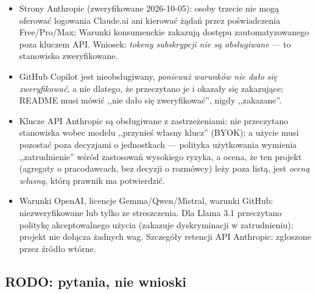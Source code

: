 \begin{itemize}[leftmargin=*]
    \item Strony Anthropic (zweryfikowane 2026-10-05): osoby trzecie nie mogą
    oferować logowania Claude.ai ani kierować żądań przez poświadczenia Free/Pro/Max;
    Warunki konsumenckie zakazują dostępu zautomatyzowanego poza kluczem API.
    Wniosek: \emph{tokeny subskrypcji nie są obsługiwane} --- to stanowisko
    zweryfikowane.
    \item GitHub Copilot jest nieobsługiwany, \emph{ponieważ warunków nie dało się
    zweryfikować}, a nie dlatego, że przeczytano je i okazały się zakazujące; README musi
    mówić ,,nie dało się zweryfikować'', nigdy ,,zakazane''.
    \item Klucze API Anthropic są obsługiwane z zastrzeżeniami: nie przeczytano
    stanowiska wobec modelu ,,przynieś własny klucz'' (BYOK); a użycie musi pozostać poza
    decyzjami o jednostkach --- polityka użytkowania wymienia ,,zatrudnienie'' wśród
    zastosowań wysokiego ryzyka, a ocena, że ten projekt (agregaty o pracodawcach, bez
    decyzji o rozmówcy) leży poza listą, jest \emph{oceną własną}, którą prawnik ma
    potwierdzić.
    \item Warunki OpenAI, licencje Gemma/Qwen/Mistral, warunki GitHub: niezweryfikowane
    lub tylko ze streszczenia. Dla Llama 3.1 przeczytano politykę akceptowalnego
    użycia (zakazuje dyskryminacji w zatrudnieniu); projekt nie dołącza żadnych wag.
    Szczegóły retencji API Anthropic: zgłoszone przez źródło wtórne.
\end{itemize}

\subsection{RODO: pytania, nie wnioski}

